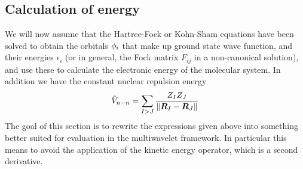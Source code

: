 \subsection{Calculation of energy}
We will now assume that the Hartree-Fock or Kohn-Sham equations have been solved to obtain
the orbitals $\phi_i$ that make up ground state wave function, and their energies 
$\epsilon_i$ (or in general, the Fock matrix $F_{ij}$ in a non-canonical solution), and use
these to calculate the electronic energy of the molecular system. In addition we have the
constant nuclear repulsion energy
\begin{equation}
    \hat{V}_{n-n} = \sum_{I>J} \frac{Z_IZ_J}{\|\boldsymbol R_I-\boldsymbol R_J\|}
\end{equation}
The goal of this section is to rewrite the expressions given above into something better 
suited for evaluation in the multiwavelet framework. In particular this means to avoid
the application of the kinetic energy operator, which is a second derivative.


